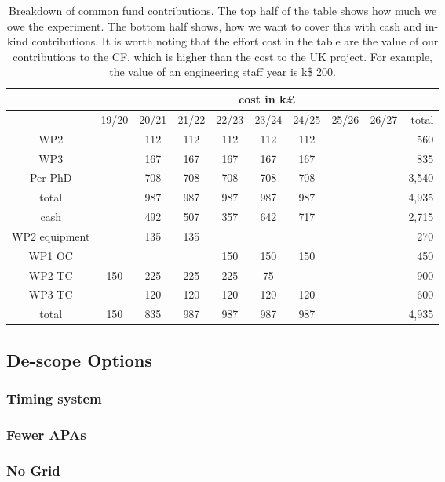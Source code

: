 \begin{table}[htbp]
    \centering
    \begin{tabular}{|c||c|c|c|c|c|c|c|c||r|}
        \cline{2-10} \multicolumn{1}{c|}{\ } & \multicolumn{9}{c|}{cost in k£}\\
         \hline
           & 19/20 & 20/21 & 21/22 & 22/23 & 23/24 & 24/25 & 25/26 & 26/27 & total\\
         \hline\hline
         WP2     & & 112 & 112 & 112 & 112 & 112 & & & 560  \\ %
         WP3     & & 167 & 167 & 167 & 167 & 167 & & & 835  \\ %
         Per PhD & & 708 & 708 & 708 & 708 & 708 & & & 3,540 \\
         \hline
         total  &  & 987 & 987 & 987 & 987 & 987 & & & 4,935 \\
         \hline\hline
         cash          &     & 492 & 507 & 357 & 642 & 717 &     &     & 2,715 \\ %
         WP2 equipment &     & 135 & 135 &     &     &     &     &     & 270 \\ %
         WP1 OC        &     &     &     & 150 & 150 & 150 &     &     & 450 \\ %
         WP2 TC        & 150 & 225 & 225 & 225 &  75 &     &     &     & 900 \\ %
         WP3 TC        &     & 120 & 120 & 120 & 120 & 120 &     &     & 600 \\ %
         \hline         
         total         & 150 & 835 & 987 & 987 & 987 & 987 &     &     & 4,935 \\
         \hline
    \end{tabular}
    \caption{Breakdown of common fund contributions. The top half of the table shows how much we owe the experiment. The bottom half shows, how we want to cover this with cash and in-kind contributions. It is worth noting that the effort cost in the table are the value of our contributions to the CF, which is higher than the cost to the UK project. For example, the value of an engineering staff year is k\$ 200. }
    \label{tab:CF}
\end{table}

\subsection{De-scope Options}

\subsubsection{Timing system}

\subsubsection{Fewer APAs}

\subsubsection{No Grid}
